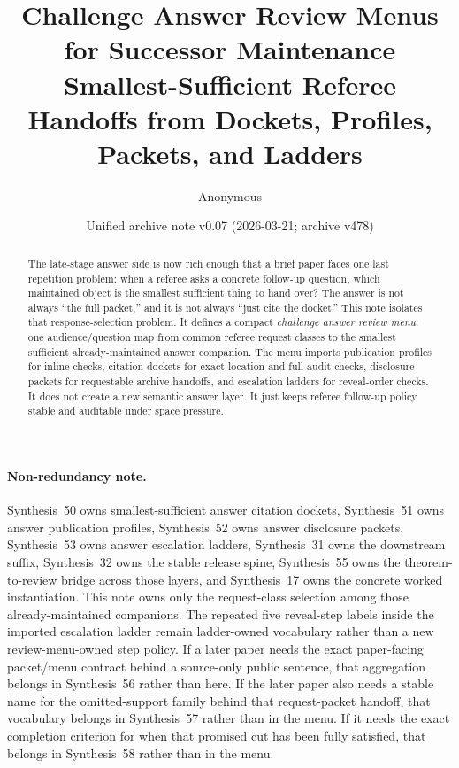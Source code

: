 \documentclass[11pt]{article}
\title{Challenge Answer Review Menus for Successor Maintenance\\\large Smallest-Sufficient Referee Handoffs from Dockets, Profiles, Packets, and Ladders}
\author{Anonymous}
\date{Unified archive note v0.07 (2026-03-21; archive v478)}
\begin{document}
\maketitle

\begin{abstract}
The late-stage answer side is now rich enough that a brief paper faces one last repetition problem: when a referee asks a concrete follow-up question, which maintained object is the smallest sufficient thing to hand over? The answer is not always ``the full packet,'' and it is not always ``just cite the docket.'' This note isolates that response-selection problem. It defines a compact \emph{challenge answer review menu}: one audience/question map from common referee request classes to the smallest sufficient already-maintained answer companion. The menu imports publication profiles for inline checks, citation dockets for exact-location and full-audit checks, disclosure packets for requestable archive handoffs, and escalation ladders for reveal-order checks. It does not create a new semantic answer layer. It just keeps referee follow-up policy stable and auditable under space pressure.
\end{abstract}

\paragraph{Non-redundancy note.}
Synthesis~50 owns smallest-sufficient answer citation dockets, Synthesis~51 owns answer publication profiles, Synthesis~52 owns answer disclosure packets, Synthesis~53 owns answer escalation ladders, Synthesis~31 owns the downstream suffix, Synthesis~32 owns the stable release spine, Synthesis~55 owns the theorem-to-review bridge across those layers, and Synthesis~17 owns the concrete worked instantiation.\cite{series:challengeanswercitationdockets,series:challengeanswerpublicationprofiles,series:challengeanswerdisclosurepackets,series:challengeanswerescalationladders,series:downstreamnormalforms,series:releasespine,series:seriesspines,series:workedexample}
This note owns only the request-class selection among those already-maintained companions. The repeated five reveal-step labels inside the imported escalation ladder remain ladder-owned vocabulary rather than a new review-menu-owned step policy. If a later paper needs the exact paper-facing packet/menu contract behind a source-only public sentence, that aggregation belongs in Synthesis~56 rather than here. If the later paper also needs a stable name for the omitted-support family behind that request-packet handoff, that vocabulary belongs in Synthesis~57 rather than in the menu. If it needs the exact completion criterion for when that promised cut has been fully satisfied, that belongs in Synthesis~58 rather than in the menu.\cite{series:publicrequestcontracts,series:requestableevidenceclasses,series:requestfulfillmentcertificates}
\end{document}
